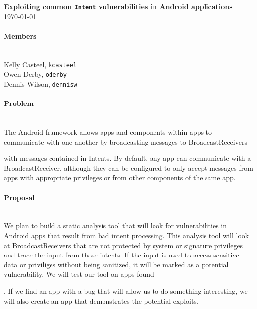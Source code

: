 \documentclass[12pt,a4paper,draft]{article}
\begin{document}
\flushleft\textbf{Exploiting common \texttt{Intent} vulnerabilities in Android %
applications}\\
\today\\

\paragraph{Members} ~\\

Kelly Casteel, \texttt{kcasteel}\\
Owen Derby, \texttt{oderby}\\
Dennis Wilson, \texttt{dennisw}\\

\paragraph{Problem} ~\\
The Android framework allows apps and components within apps to communicate with
one another by broadcasting messages to BroadcastReceivers \begin{comment} link
to documentation \end{comment} with messages contained in Intents. By default,
any app can communicate with a BroadcastReceiver, although they can be
configured to only accept messages from apps with appropriate privileges or from
other components of the same app.

\paragraph{Proposal} ~\\
We plan to build a static analysis tool that will look for vulnerabilities in
Android apps that result from bad intent processing. This analysis tool will
look at BroadcastReceivers that are not protected by system or signature
privileges and trace the input from those intents. If the input is used to
access sensitive data or priviliges without being sanitized, it will be marked
as a potential vulnerability. We will test our tool on apps found
\begin{comment}google code site\end{comment}. If we find an app with a bug that
will allow us to do something interesting, we will also create an app that
demonstrates the potential exploits.
\end{document}
